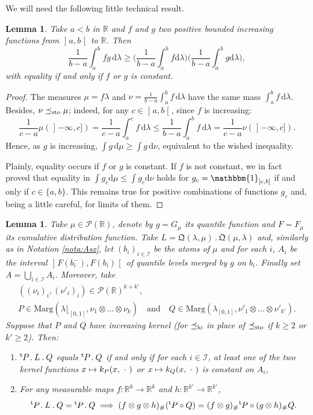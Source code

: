 \documentclass[JEP,XML,SOM,Unicode,NoEqCountersInSection,NoFloatCountersInSection,published]{cedram}
\newcommand{\ldot}{\mathbin{.}}
\newcommand\mto{\mathchoice{\longmapsto}{\mapsto}{\mapsto}{\mapsto}}
\theoremstyle{plain}
\newtheorem{lem}[them]{Lemma}
\theoremstyle{definition}
\newcommand{\dd}{\mathrm{d}}
\newcommand{\como}{\mathfrak{Q}}
\newcommand{\one}{\mathbbm{1}}
\newcommand{\trans}{{}^{\mathrm{t}}\mkern-1mu}
\newcommand{\la}{\lambda}
\newcommand{\p}{\mathcal{P}}
\newcommand{\ma}{\mathrm{Marg}}
\newcommand{\R}{\mathbb{R}}
\newcommand{\AND}{\quad\text{and}\quad}
\newcommand{\leqs}{\preceq_{\text{\rm sto}}}
\newcommand{\op}{\mathopen}
\newcommand{\clo}{\mathclose}
\newcommand{\leqlc}{\preceq_{\rm lo}}
\begin{document}
We will need the following little technical result.

\begin{lem}\label{lem:int_fg}Take $a<b$ in $\R$ and $f$ and $g$ two positive bounded increasing functions from $\op]a,b\clo[$ to $\R$. Then
\[
\frac1{b-a}\int_a^b fg\,\dd\la\geq \biggl(\frac1{b-a}\int_a^b f\dd\la\biggr)\biggl(\frac1{b-a}\int_a^b g\dd\la\biggr),
\]
with equality if and only if $f$ or $g$ is constant.
\end{lem}

\begin{proof} The %
measures $\mu=f\la$ and $\nu=\frac1{b-a}\int_a^b f\,\dd\la$ have the same mass $\int_a^b f\,\dd\la$. Besides, $\nu\leqs\mu$; indeed, for any $c\in\op]a,b\clo[$, since $f$ is increasing:
\[\frac1{c-a}\mu(\op]-\infty,c])=\frac1{c-a}\int_{a}^c f\,\dd\la\leq\frac1{b-a}\int_{a}^b f\,\dd\la=\frac1{c-a}\nu(\op]-\infty,c]).\]
Hence, as $g$ is increasing, $\int g\,\dd\mu\geq\int g\,\dd\nu$, equivalent to the wished inequality.

Plainly, equality occurs if $f$ or $g$ is constant. If $f$ is not constant, we in fact proved that equality in $\int g_c \dd \mu\leq \int g_c \dd \nu$ holds for $g_c=\one_{[c,b]}$ if and only if $c\in\{a,b\}$. This remains true for positive combinations of functions $g_c$ and, being a little careful, for limits of them.
\end{proof}

\begin{lem}\label{lem:distributivite} Take $\mu\!\in\!\p(\R)$, denote by $g\!=\!G_\mu$ its quantile function and \hbox{$F\!=\!F_\mu$} its cumulative distribution function. Take $L=\como(\la,\mu)\ldot\como(\mu,\la)$ and, similarly as in Nota\-tion \ref{nota:Asx}, let $(b_i)_{i\in{\mathcal{I}}}$ be the atoms of $\mu$ and for each $i$, $A_i$ be the interval $\op]F(b_i^-),F(b_i)\clo[$ of quantile levels merged by $g$ on $b_i$. Finally set $A=\bigcup_{i\in\mathcal{I}}A_i$. Moreover, take\vspace*{-3pt}
\begin{gather*}
((\nu_i)_i,(\nu'_i)_i)\in\p(\R)^{k+k'},\\
P\in \ma(\la\lfloor_{[0,1]},\nu_1\otimes\ldots\otimes\nu_k)\AND Q\in\ma(\la_{[0,1]},\nu'_1\otimes\ldots\otimes\nu'_{k'}).
\end{gather*}
Suppose that $P$ and $Q$ have increasing kernel (for $\leqlc$ in place of $\leqs$ if $k\geq 2$ or $k'\geq2$). Then:
\begin{enumerate}
\item
\label{item:lem:distributiviteA} $\trans P\ldot L\ldot Q$ equals $\trans P\ldot Q$ if and only if for each $i\in{\mathcal I}$, at least one of the two kernel functions $x\mto k_P(x,\ \cdot\ )$ or $x\mto k_Q(x,\ \cdot\ )$ is constant on $A_i$,

\item
\label{item:lem:distributiviteB} For any measurable maps $f:\R^k\to\R^k$ and $h:\R^{k'}\to\R^{k'}$,
\[
\trans P\ldot L\ldot Q=\trans P\ldot Q\implies (f\otimes g \otimes h)_\#(\trans P\circ Q)=(f\otimes g)_\#\trans P\circ (g \otimes h)_\#Q.
\]
\end{enumerate}
\end{lem}
\end{document}
